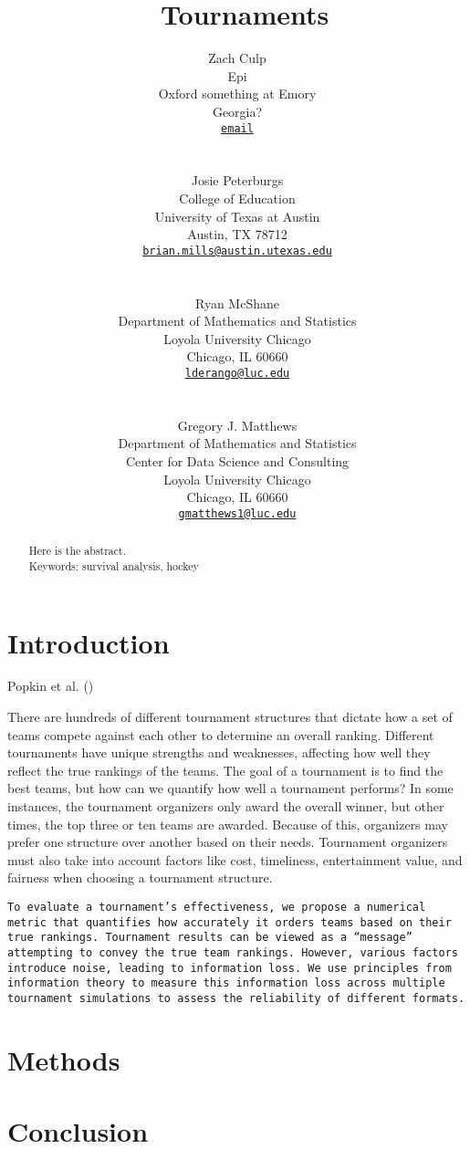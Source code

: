 \documentclass[
  12pt,
]{article}
\title{~\large Tournaments}
\author{\large Zach Culp \vspace{-1.1mm}\\
\normalsize Epi \vspace{-1mm}\\
\normalsize Oxford something at Emory \vspace{-1mm}\\
\normalsize Georgia? \vspace{-1mm}\\
\normalsize \href{mailto:ypu@something.edu}{\texttt{email}}
\vspace{-1mm}\\
\strut \\
\large Josie Peterburgs \vspace{-1.1mm}\\
\normalsize College of Education \vspace{-1mm}\\
\normalsize University of Texas at Austin \vspace{-1mm}\\
\normalsize Austin, TX 78712 \vspace{-1mm}\\
\normalsize \href{mailto:brian.mills@austin.utexas.edu}{\texttt{brian.mills@austin.utexas.edu}}
\vspace{-1mm}\\
\strut \\
\large Ryan McShane \vspace{-1.1mm}\\
\normalsize Department of Mathematics and Statistics \vspace{-1mm}\\
\normalsize Loyola University Chicago \vspace{-1mm}\\
\normalsize Chicago, IL 60660 \vspace{-1mm}\\
\normalsize \href{mailto:lderango@luc.edu}{\texttt{lderango@luc.edu}}
\vspace{-1mm}\\
\strut \\
\large Gregory J. Matthews \vspace{-1.1mm}\\
\normalsize Department of Mathematics and Statistics \vspace{-1mm}\\
\normalsize Center for Data Science and Consulting \vspace{-1mm}\\
\normalsize Loyola University Chicago \vspace{-1mm}\\
\normalsize Chicago, IL 60660 \vspace{-1mm}\\
\normalsize \href{mailto:gmatthews1@luc.edu}{\texttt{gmatthews1@luc.edu}}
\vspace{-1mm}}
\date{}
\begin{document}
\maketitle
\begin{abstract}
Here is the abstract.\\

\vspace{2mm} \textbar{} Keywords: survival analysis, hockey
\end{abstract}

\section{Introduction}\label{introduction}

Popkin et al. ()

There are hundreds of different tournament structures that dictate how a
set of teams compete against each other to determine an overall ranking.
Different tournaments have unique strengths and weaknesses, affecting
how well they reflect the true rankings of the teams. The goal of a
tournament is to find the best teams, but how can we quantify how well a
tournament performs? In some instances, the tournament organizers only
award the overall winner, but other times, the top three or ten teams
are awarded. Because of this, organizers may prefer one structure over
another based on their needs. Tournament organizers must also take into
account factors like cost, timeliness, entertainment value, and fairness
when choosing a tournament structure.

\begin{verbatim}
To evaluate a tournament’s effectiveness, we propose a numerical metric that quantifies how accurately it orders teams based on their true rankings. Tournament results can be viewed as a “message” attempting to convey the true team rankings. However, various factors introduce noise, leading to information loss. We use principles from information theory to measure this information loss across multiple tournament simulations to assess the reliability of different formats.
\end{verbatim}

\section{Methods}\label{methods}

\section{Conclusion}\label{sec:conclusion}
\end{document}
